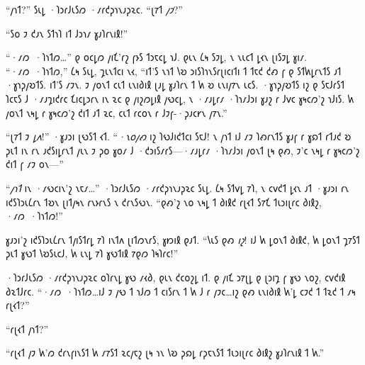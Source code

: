 “𐑢𐑪𐑑?” 𐑕𐑧𐑛 ·𐑐𐑮𐑩𐑓𐑧𐑕𐑼 ·𐑥𐑩𐑒𐑜𐑪𐑯𐑨𐑜𐑷𐑤. “𐑚𐑳𐑑 \emph{𐑢𐑲}?”

“𐑕𐑴 𐑲 𐑒𐑨𐑯 𐑕𐑑𐑪𐑐 𐑦𐑑 𐑓𐑮𐑪𐑥 𐑣𐑨𐑐𐑩𐑯𐑦𐑙!”

“·𐑥𐑼~·𐑐𐑪𐑑𐑼…” 𐑞 𐑴𐑤𐑛𐑼 𐑢𐑦𐑗'𐑩𐑟 𐑝𐑶𐑕 𐑑𐑮𐑱𐑤𐑛 𐑪𐑓. 𐑞𐑧𐑯 𐑖𐑰 𐑕𐑲𐑛, 𐑯 𐑯𐑧𐑤𐑑 𐑛𐑬𐑯 𐑚𐑦𐑕𐑲𐑛 𐑣𐑦𐑥. “·𐑥𐑼~·𐑐𐑪𐑑𐑼,” 𐑖𐑰 𐑕𐑧𐑛, 𐑡𐑧𐑯𐑑𐑤𐑦 𐑯𐑬, “𐑦𐑑'𐑕 𐑯𐑪𐑑 𐑘𐑹 𐑮𐑦𐑕𐑐𐑪𐑯𐑕𐑩𐑚𐑦𐑤𐑦𐑑𐑦 𐑑 𐑑𐑱𐑒 𐑒𐑺 𐑝 𐑞 𐑕𐑑𐑿𐑛𐑩𐑯𐑑𐑕 𐑨𐑑 ·𐑣𐑪𐑜𐑢𐑹𐑑𐑕. 𐑦𐑑'𐑕 𐑥𐑲𐑯. 𐑲 𐑢𐑴𐑯𐑑 𐑤𐑧𐑑 𐑧𐑯𐑦𐑔𐑦𐑙 𐑚𐑨𐑛 𐑣𐑨𐑐𐑩𐑯 𐑑 𐑿 𐑹 𐑧𐑯𐑦𐑢𐑳𐑯 𐑧𐑤𐑕. ·𐑣𐑪𐑜𐑢𐑹𐑑𐑕 𐑦𐑟 𐑞 𐑕𐑱𐑓𐑩𐑕𐑑 𐑐𐑤𐑱𐑕 𐑓 ·𐑥𐑨𐑡𐑦𐑒𐑩𐑤 𐑗𐑦𐑤𐑛𐑮𐑩𐑯 𐑦𐑯 𐑷𐑤 𐑞 𐑢𐑦𐑟𐑼𐑛𐑦𐑙 𐑢𐑻𐑤𐑛, 𐑯 ·𐑥𐑨𐑛𐑩𐑥 ·𐑐𐑪𐑥𐑓𐑮𐑦 𐑣𐑨𐑟 𐑩 𐑓𐑫𐑤 𐑣𐑰𐑤𐑼'𐑟 𐑪𐑓𐑦𐑕. 𐑿 𐑢𐑴𐑯𐑑 𐑯𐑰𐑛 𐑩 𐑣𐑰𐑤𐑼'𐑟 𐑒𐑦𐑑 𐑨𐑑 𐑷𐑤, 𐑤𐑧𐑑 𐑩𐑤𐑴𐑯 𐑩 𐑓𐑲𐑝-·𐑜𐑨𐑤𐑾𐑯 𐑢𐑳𐑯.”

“𐑚𐑳𐑑 𐑲 \emph{𐑛𐑵}!” ·𐑣𐑨𐑮𐑦 𐑚𐑻𐑕𐑑 𐑬𐑑. “\emph{·𐑯𐑴𐑢𐑺} 𐑦𐑟 𐑐𐑻𐑓𐑦𐑒𐑑𐑤𐑦 𐑕𐑱𐑓! 𐑯 𐑢𐑪𐑑 𐑦𐑓 𐑥𐑲 𐑐𐑺𐑩𐑯𐑑𐑕 𐑣𐑨𐑝 𐑩 𐑣𐑸𐑑 𐑩𐑑𐑨𐑒 𐑹 𐑜𐑧𐑑 𐑦𐑯 𐑩𐑯 𐑨𐑒𐑕𐑦𐑛𐑩𐑯𐑑 𐑢𐑧𐑯 𐑲 𐑜𐑴 𐑣𐑴𐑥 𐑓 ·𐑒𐑮𐑦𐑕𐑥𐑩𐑕—·𐑥𐑨𐑛𐑩𐑥 ·𐑐𐑪𐑥𐑓𐑮𐑦 𐑢𐑴𐑯𐑑 𐑚𐑰 𐑞𐑺, 𐑲'𐑤 𐑯𐑰𐑛 𐑩 𐑣𐑰𐑤𐑼'𐑟 𐑒𐑦𐑑 𐑝 𐑥𐑲 𐑴𐑯—”

“\emph{𐑢𐑪𐑑} 𐑦𐑯 ·𐑥𐑻𐑤𐑦𐑯'𐑟 𐑯𐑱𐑥…” ·𐑐𐑮𐑩𐑓𐑧𐑕𐑼 ·𐑥𐑩𐑒𐑜𐑪𐑯𐑨𐑜𐑷𐑤 𐑕𐑧𐑛. 𐑖𐑰 𐑕𐑑𐑫𐑛 𐑳𐑐, 𐑯 𐑤𐑫𐑒𐑑 𐑛𐑬𐑯 𐑨𐑑 ·𐑣𐑨𐑮𐑦 𐑩𐑯 𐑦𐑒𐑕𐑐𐑮𐑧𐑖𐑩𐑯 𐑑𐑹𐑯 𐑚𐑦𐑑𐑢𐑰𐑯 𐑩𐑯𐑶𐑩𐑯𐑕 𐑯 𐑒𐑩𐑯𐑕𐑻𐑯. “𐑞𐑺'𐑟 𐑯𐑴 𐑯𐑰𐑛 𐑑 𐑔𐑦𐑙𐑒 𐑩𐑚𐑬𐑑 𐑕𐑳𐑗 𐑑𐑧𐑮𐑦𐑚𐑩𐑤 𐑔𐑦𐑙𐑟, ·𐑥𐑼~·𐑐𐑪𐑑𐑼!”

𐑣𐑨𐑮𐑦'𐑟 𐑦𐑒𐑕𐑐𐑮𐑧𐑖𐑩𐑯 𐑑𐑢𐑦𐑕𐑑𐑩𐑛 𐑳𐑐 𐑦𐑯𐑑𐑵 𐑚𐑦𐑑𐑼𐑯𐑩𐑕, 𐑣𐑽𐑦𐑙 𐑞𐑨𐑑. “𐑘𐑧𐑕 𐑞𐑺 \emph{𐑦𐑟}! 𐑦𐑓 𐑿 𐑛𐑴𐑯𐑑 𐑔𐑦𐑙𐑒, 𐑿 𐑛𐑴𐑯𐑑 𐑡𐑳𐑕𐑑 𐑜𐑧𐑑 𐑣𐑻𐑑 𐑘𐑹𐑕𐑧𐑤𐑓, 𐑿 𐑧𐑯𐑛 𐑳𐑐 𐑣𐑻𐑑𐑦𐑙 𐑳𐑞𐑼 𐑐𐑰𐑐𐑩𐑤!”

·𐑐𐑮𐑩𐑓𐑧𐑕𐑼 ·𐑥𐑩𐑒𐑜𐑪𐑯𐑨𐑜𐑷𐑤 𐑴𐑐𐑩𐑯𐑛 𐑣𐑻 𐑥𐑬𐑔, 𐑞𐑧𐑯 𐑒𐑤𐑴𐑟𐑛 𐑦𐑑. 𐑞 𐑢𐑦𐑗 𐑮𐑳𐑚𐑛 𐑞 𐑚𐑮𐑦𐑡 𐑝 𐑣𐑻 𐑯𐑴𐑟, 𐑤𐑫𐑒𐑦𐑙 𐑔𐑷𐑑𐑓𐑩𐑤. “·𐑥𐑼~·𐑐𐑪𐑑𐑼…𐑦𐑓 𐑲 𐑢𐑻 𐑑 𐑪𐑓𐑼 𐑑 𐑤𐑦𐑕𐑩𐑯 𐑑 𐑿 𐑓 𐑩 𐑢𐑲𐑤…𐑦𐑟 𐑞𐑺 𐑧𐑯𐑦𐑔𐑦𐑙 𐑿'𐑛 𐑤𐑲𐑒 𐑑 𐑑𐑷𐑒 𐑑 𐑥𐑰 𐑩𐑚𐑬𐑑?”

“𐑩𐑚𐑬𐑑 𐑢𐑪𐑑?”

“𐑩𐑚𐑬𐑑 𐑢𐑲 𐑿'𐑼 𐑒𐑩𐑯𐑝𐑦𐑯𐑕𐑑 𐑿 𐑥𐑳𐑕𐑑 𐑷𐑤𐑢𐑱𐑟 𐑚𐑰 𐑪𐑯 𐑘𐑹 𐑜𐑸𐑛 𐑩𐑜𐑱𐑯𐑕𐑑 𐑑𐑧𐑮𐑦𐑚𐑩𐑤 𐑔𐑦𐑙𐑟 𐑣𐑨𐑐𐑩𐑯𐑦𐑙 𐑑 𐑿.”

